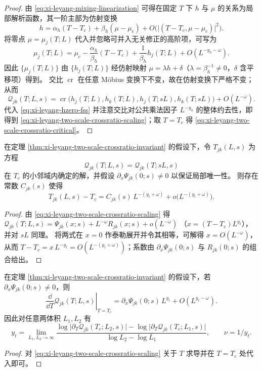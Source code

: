 \begin{proof}
由 \eqref{eq:xi-leyang-mixing-linearization} 可得在固定 \(T\) 下 \(h\) 与 \(\mu\) 的关系为局部解析函数，其一阶主部为仿射变换
\[
h=\alpha_h(T-T_c)+\beta_h(\mu-\mu_c)+O\!\bigl(\lvert(T-T_c,\mu-\mu_c)\rvert^2\bigr).
\]
将零点 \(\mu=\mu_j(T;L)\) 代入并忽略可并入无关修正的高阶项，可写为
\[
\mu_j(T;L)=\mu_c-\frac{\alpha_h}{\beta_h}(T-T_c)+\frac{1}{\beta_h}h_j(T;L)+O(L^{-y_h-\omega}).
\]
因此 \(\{\mu_j(T;L)\}\) 由 \(\{h_j(T;L)\}\) 经仿射映射 \(\mu=\lambda h+\delta\)（\(\lambda=\beta_h^{-1}\neq 0\)，\(\delta\) 含平移项）得到。
交比 \(\operatorname{cr}\) 在任意 Möbius 变换下不变，故在仿射变换下严格不变；从而
\[
\mathcal Q_{jk}(T;L,s)
=
\operatorname{cr}\bigl(h_j(T;L),h_k(T;L),h_j(T;sL),h_k(T;sL)\bigr)+O(L^{-\omega}).
\]
代入 \eqref{eq:xi-leyang-hzero-fss} 并注意交比对公共乘法因子 \(L^{-y_h}\) 的整体约去性，即得到 \eqref{eq:xi-leyang-two-scale-crossratio-scaling}；取 \(T=T_c\) 得 \eqref{eq:xi-leyang-two-scale-crossratio-critical}。
\end{proof}

\begin{corollary}[交比交汇点的漂移阶]\label{cor:xi-leyang-two-scale-crossratio-crossing-drift}
在定理 \ref{thm:xi-leyang-two-scale-crossratio-invariant} 的假设下，令 \(T_{jk}(L,s)\) 为方程
\begin{equation}\label{eq:xi-leyang-two-scale-crossratio-crossing-eq}
\mathcal Q_{jk}(T;L,s)=\mathcal Q_{jk}(T;sL,s)
\end{equation}
在 \(T_c\) 的小邻域内确定的解，并假设 \(\partial_x\Psi_{jk}(0;s)\neq 0\) 以保证局部唯一性。
则存在常数 \(C_{jk}(s)\) 使得
\[
T_{jk}(L,s)-T_c
=
C_{jk}(s)\,L^{-(y_t+\omega)}+o\!\bigl(L^{-(y_t+\omega)}\bigr).
\]
\end{corollary}
\begin{proof}
由 \eqref{eq:xi-leyang-two-scale-crossratio-scaling} 得
\(
\mathcal Q_{jk}(T;L,s)=\Psi_{jk}(x;s)+L^{-\omega}R_{jk}(x;s)+o(L^{-\omega})
\)
（\(x=(T-T_c)L^{y_t}\)），并对 \(sL\) 同理。
将两式在 \(x=0\) 作泰勒展开并令其相等，可解得 \(x=O(L^{-\omega})\)，从而 \(T-T_c=x\,L^{-y_t}=O(L^{-(y_t+\omega)})\)；系数由 \(\partial_x\Psi_{jk}(0;s)\) 与 \(R_{jk}(0;s)\) 的组合给出。
\end{proof}

\begin{proposition}[由交比斜率反演相关指数]\label{prop:xi-leyang-two-scale-crossratio-slope-exponent}
在定理 \ref{thm:xi-leyang-two-scale-crossratio-invariant} 的假设下，若 \(\partial_x\Psi_{jk}(0;s)\neq 0\)，则
\[
\left.\frac{\dd}{\dd T}\mathcal Q_{jk}(T;L,s)\right|_{T=T_c}
=
\partial_x\Psi_{jk}(0;s)\,L^{y_t}+O(L^{y_t-\omega}).
\]
因此对任意两体积 \(L_1,L_2\) 有
\[
y_t
=
\lim_{L_1,L_2\to\infty}
\frac{\log\bigl|\partial_T\mathcal Q_{jk}(T_c;L_2,s)\bigr|-\log\bigl|\partial_T\mathcal Q_{jk}(T_c;L_1,s)\bigr|}
{\log L_2-\log L_1},
\qquad
\nu=1/y_t.
\]
\end{proposition}
\begin{proof}
对 \eqref{eq:xi-leyang-two-scale-crossratio-scaling} 关于 \(T\) 求导并在 \(T=T_c\) 处代入即可。
\end{proof}


